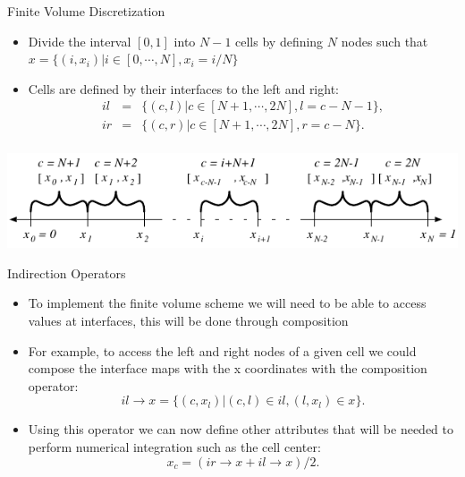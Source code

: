 \documentclass{beamer}
\begin{document}
\begin{frame}{Finite Volume Discretization}
\begin{itemize}
\item Divide the interval $[0,1]$ into  $N-1$ cells by defining $N$ nodes such that $x = \lbrace (i,x_i) | i \in [0, \cdots, N], x_i = i/N \rbrace$
\item Cells are defined by their interfaces to the left and right:
\begin{equation*}
\begin{array}{rcl}
il & = & \lbrace (c,l) | c \in [N+1, \cdots, 2N], l = c-N-1 \rbrace,\\
ir & = & \lbrace (c,r) | c \in [N+1, \cdots, 2N], r = c-N \rbrace.\\
\end{array}
\end{equation*}
\end{itemize}
\begin{center}
\includegraphics[height=.75in]{one-d}
\end{center}
\end{frame}
\begin{frame}{Indirection Operators}
\begin{itemize}
  \item To implement the finite volume scheme we will need to be able to access values at interfaces, this will be done through composition
  \item For example, to access the left and right nodes of a given cell we could compose the interface maps with the x coordinates with the composition operator:
\begin{equation*}
il\rightarrow x = \lbrace (c,x_l) | (c,l) \in il, (l,x_l) \in x \rbrace.
\end{equation*}
\item Using this operator we can now define other attributes that will be needed to perform numerical integration such as the cell center:
\begin{equation*}
x_c = (ir \rightarrow x + il \rightarrow x)/2.
\end{equation*}
\end{itemize}
\end{frame}
\end{document}
